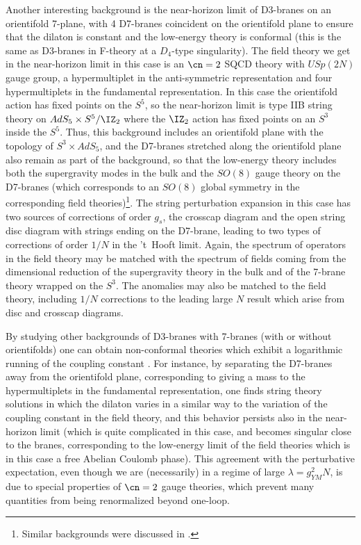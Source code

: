 Another interesting background is the near-horizon limit of D3-branes
on an orientifold 7-plane, with 4 D7-branes coincident on the
orientifold plane to ensure \cite{Sen:1996vd,Banks:1996nj} 
that the dilaton is constant and
the low-energy theory is conformal (this is the same as D3-branes in
F-theory \cite{Vafa:1996xn} 
at a $D_4$-type singularity). The field theory we get
in the near-horizon limit in this case is
\cite{Aharony:1997en,Douglas:1997js} an $\cn=2$ SQCD
theory with $USp(2N)$ gauge group, a hypermultiplet in the
anti-symmetric representation and four hypermultiplets in the
fundamental representation. In this case the orientifold action has
fixed points on the $S^5$, so the near-horizon limit is
\cite{Fayyazuddin:1998fb,Aharony:1998xz} type IIB string theory on
$AdS_5\times S^5/\IZ_2$ where the $\IZ_2$ action has fixed points on
an $S^3$ inside the $S^5$. Thus, this background includes an
orientifold plane with the topology of $S^3\times AdS_5$, and the
D7-branes stretched along the orientifold plane also remain as part of
the background, so that the low-energy theory includes both the
supergravity modes in the bulk and the $SO(8)$ gauge theory on the
D7-branes (which corresponds to an $SO(8)$ global symmetry in the
corresponding field theories)\footnote{Similar backgrounds were
discussed in \cite{Kehagias:1998gn}.}. The string perturbation expansion
in this case has two sources of corrections of order $g_s$, the
crosscap diagram and the open string disc diagram with strings ending
on the D7-brane, leading to two types of corrections of order $1/N$ in
the 't~Hooft limit. Again, the spectrum of operators in the field
theory may be matched \cite{Aharony:1998xz} with the spectrum of
fields coming from the dimensional reduction of the supergravity
theory in the bulk and of the 7-brane theory wrapped on the $S^3$. The
anomalies may also be matched to the field theory, including $1/N$
corrections to the leading large $N$ result \cite{Aharony:1999rz}
which arise from disc and crosscap diagrams.

By studying other backgrounds of D3-branes with 7-branes (with or
without orientifolds) one can obtain 
non-conformal theories which
exhibit a logarithmic running of the coupling constant
\cite{Aharony:1998xz,deMelloKoch:1999hn}. For instance, by separating the
D7-branes away from the orientifold plane, corresponding to giving a
mass to the hypermultiplets in the fundamental representation, one
finds string theory solutions in which the dilaton varies in a similar
way to the variation of the coupling constant in the field theory, and
this behavior persists also in the near-horizon limit (which is quite
complicated in this case, and becomes singular close to the branes,
corresponding to the low-energy limit of the field theories which is
in this case a free Abelian Coulomb phase). This agreement with the
perturbative expectation, even though we are (necessarily) in a regime
of large $\lambda = g_{YM}^2 N$, is due to special properties of
$\cn=2$ gauge theories, which prevent many quantities from being
renormalized beyond one-loop.



